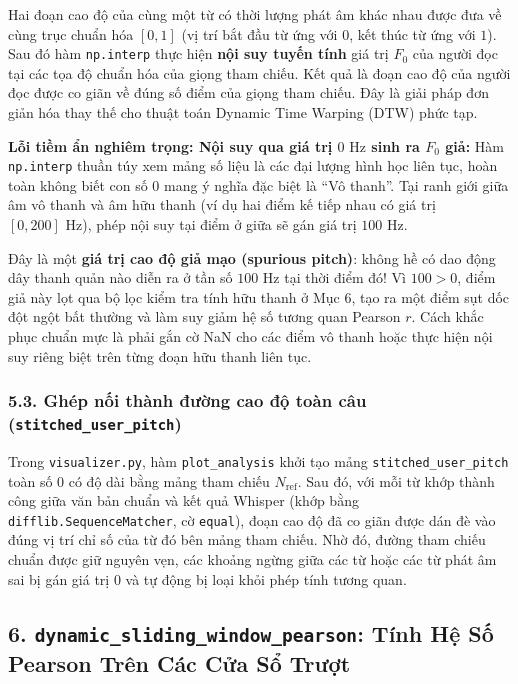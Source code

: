 \documentclass[11pt,a4paper]{article}
\begin{document}
Hai đoạn cao độ của cùng một từ có thời lượng phát âm khác nhau được đưa về cùng trục chuẩn hóa $[0, 1]$ (vị trí bắt đầu từ ứng với $0$, kết thúc từ ứng với $1$). Sau đó hàm \texttt{np.interp} thực hiện \textbf{nội suy tuyến tính} giá trị $F_0$ của người đọc tại các tọa độ chuẩn hóa của giọng tham chiếu. Kết quả là đoạn cao độ của người đọc được co giãn về đúng số điểm của giọng tham chiếu. Đây là giải pháp đơn giản hóa thay thế cho thuật toán Dynamic Time Warping (DTW) phức tạp.

\begin{physicalinsight}
\textbf{Lỗi tiềm ẩn nghiêm trọng: Nội suy qua giá trị $0\text{ Hz}$ sinh ra $F_0$ giả:}
Hàm \texttt{np.interp} thuần túy xem mảng số liệu là các đại lượng hình học liên tục, hoàn toàn không biết con số $0$ mang ý nghĩa đặc biệt là ``Vô thanh''. Tại ranh giới giữa âm vô thanh và âm hữu thanh (ví dụ hai điểm kế tiếp nhau có giá trị $[0, 200]\text{ Hz}$), phép nội suy tại điểm ở giữa sẽ gán giá trị $100\text{ Hz}$. 

Đây là một \textbf{giá trị cao độ giả mạo (spurious pitch)}: không hề có dao động dây thanh quản nào diễn ra ở tần số $100\text{ Hz}$ tại thời điểm đó! Vì $100 > 0$, điểm giả này lọt qua bộ lọc kiểm tra tính hữu thanh ở Mục 6, tạo ra một điểm sụt dốc đột ngột bất thường và làm suy giảm hệ số tương quan Pearson $r$. Cách khắc phục chuẩn mực là phải gắn cờ NaN cho các điểm vô thanh hoặc thực hiện nội suy riêng biệt trên từng đoạn hữu thanh liên tục.
\end{physicalinsight}

\subsubsection*{5.3. Ghép nối thành đường cao độ toàn câu (\texttt{stitched\_user\_pitch})}
Trong \texttt{visualizer.py}, hàm \texttt{plot\_analysis} khởi tạo mảng \texttt{stitched\_user\_pitch} toàn số 0 có độ dài bằng mảng tham chiếu $N_{\text{ref}}$. Sau đó, với mỗi từ khớp thành công giữa văn bản chuẩn và kết quả Whisper (khớp bằng \texttt{difflib.SequenceMatcher}, cờ \texttt{equal}), đoạn cao độ đã co giãn được dán đè vào đúng vị trí chỉ số của từ đó bên mảng tham chiếu. Nhờ đó, đường tham chiếu chuẩn được giữ nguyên vẹn, các khoảng ngừng giữa các từ hoặc các từ phát âm sai bị gán giá trị $0$ và tự động bị loại khỏi phép tính tương quan.

\subsection*{6. \texttt{dynamic\_sliding\_window\_pearson}: Tính Hệ Số Pearson Trên Các Cửa Sổ Trượt}
\end{document}
